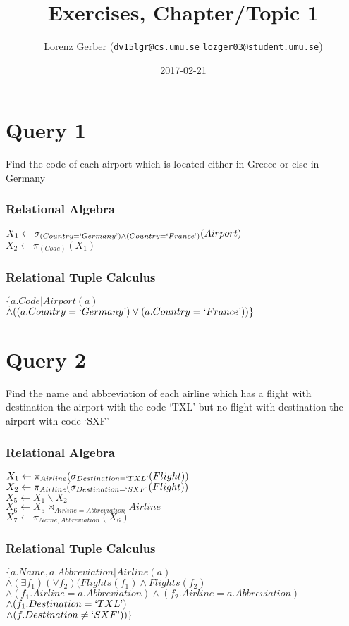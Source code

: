 \documentclass[a4paper,11pt,twoside]{article}
\title{Exercises, Chapter/Topic 1}
\author{Lorenz Gerber ({\tt{dv15lgr@cs.umu.se}} {\tt{lozger03@student.umu.se}})}
\date{2017-02-21}
\begin{document}
\lstset{language=C}
\maketitle
\thispagestyle{empty}
\newpage
\tableofcontents
\thispagestyle{empty}
\newpage

\clearpage
{}

\section{Query 1}
Find the code of each airport which is located either in Greece or else in Germany
\subsubsection*{Relational Algebra}
$X_1 \leftarrow \sigma_{(Country = `Germany\textrm') \land (Country = `France\textrm')}(Airport)$\\
$X_2 \leftarrow \pi_{(Code)}(X_1)$\\

\subsubsection*{Relational Tuple Calculus}
$\{a.Code|Airport(a)$\\
$\land((a.Country = `Germany\textrm') \lor (a.Country = `France\textrm'))\}$

\section{Query 2}
Find the name and abbreviation of each airline which has a flight with destination the airport with the code `TXL' but no flight with destination the airport with code `SXF'
\subsubsection*{Relational Algebra}
$X_1 \leftarrow \pi_{Airline}(\sigma_{Destination=`TXL\textrm'}(Flight))$\\
$X_2 \leftarrow \pi_{Airline}(\sigma_{Destination=`SXF\textrm'}(Flight))$\\
$X_5 \leftarrow X_1 \backslash X_2$\\
$X_6 \leftarrow X_5 \Join_{Airline=Abbreviation} Airline$\\
$X_7 \leftarrow \pi_{Name, Abbreviation}(X_6)$\\

\subsubsection*{Relational Tuple Calculus}
$\{a.Name, a.Abbreviation|Airline(a)$\\
$\land (\exists f_1)(\forall f_2)(Flights(f_1) \land Flights(f_2)$\\
$\land (f_1.Airline = a.Abbreviation) \land (f_2.Airline = a.Abbreviation)$\\
$\land (f_1.Destination = `TXL\textrm')$\\
$\land (f.Destination \neq `SXF\textrm'))\}$\\
\end{document}
